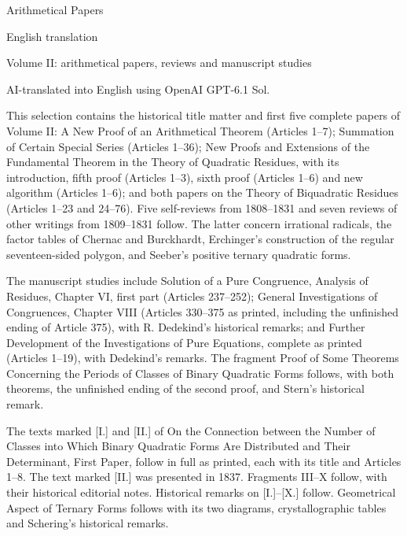 \begin{titlepage}\centering
\vspace*{1cm}{\Large Carl Friedrich Gauss\par}\bigskip
{\huge Arithmetical Papers\par}\bigskip
{\Large English translation\par}\medskip
{\large Volume II: arithmetical papers, reviews and manuscript studies\par}\bigskip\vfill
{\small AI-translated into English using OpenAI GPT-6.1 Sol.\par}
\clearpage\thispagestyle{empty}
\begin{minipage}{0.90\linewidth}\small
This selection contains the historical title matter and first five complete papers of Volume II: A New Proof of an Arithmetical Theorem (Articles 1–7); Summation of Certain Special Series (Articles 1–36); New Proofs and Extensions of the Fundamental Theorem in the Theory of Quadratic Residues, with its introduction, fifth proof (Articles 1–3), sixth proof (Articles 1–6) and new algorithm (Articles 1–6); and both papers on the Theory of Biquadratic Residues (Articles 1–23 and 24–76). Five self-reviews from 1808–1831 and seven reviews of other writings from 1809–1831 follow. The latter concern irrational radicals, the factor tables of Chernac and Burckhardt, Erchinger’s construction of the regular seventeen-sided polygon, and Seeber’s positive ternary quadratic forms.

The manuscript studies include Solution of a Pure Congruence, Analysis of Residues, Chapter VI, first part (Articles 237–252); General Investigations of Congruences, Chapter VIII (Articles 330–375 as printed, including the unfinished ending of Article 375), with R. Dedekind’s historical remarks; and Further Development of the Investigations of Pure Equations, complete as printed (Articles 1–19), with Dedekind’s remarks. The fragment Proof of Some Theorems Concerning the Periods of Classes of Binary Quadratic Forms follows, with both theorems, the unfinished ending of the second proof, and Stern’s historical remark.

The texts marked [I.] and [II.] of On the Connection between the Number of Classes into Which Binary Quadratic Forms Are Distributed and Their Determinant, First Paper, follow in full as printed, each with its title and Articles 1–8. The text marked [II.] was presented in 1837. Fragments III–X follow, with their historical editorial notes. Historical remarks on [I.]–[X.] follow. Geometrical Aspect of Ternary Forms follows with its two diagrams, crystallographic tables and Schering’s historical remarks.


\end{minipage}
\end{titlepage}
